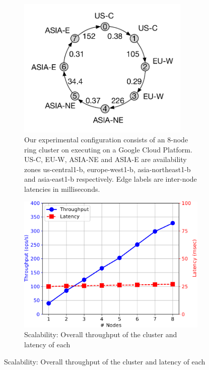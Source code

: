 \begin{figure}[t]
  \centering
	\begin{subfigure}{0.45\textwidth}
		\includegraphics[width=0.9\textwidth]{Figures/cluster.pdf}
		\caption{Our experimental configuration consists of an 8-node ring cluster
			on executing on a Google Cloud Platform. US-C, EU-W, ASIA-NE and ASIA-E
			are availability zones us-central1-b, europe-west1-b, asia-northeast1-b
			and asia-east1-b respectively. Edge labels are inter-node latencies in
		milliseconds.}
		\label{fig:cluster}
	\end{subfigure}
	\hfill
	\begin{subfigure}{0.45\textwidth}
		\includegraphics[width=\textwidth]{Graphs/scalability.pdf}
		\caption{Scalability: Overall throughput of the cluster and latency of each
}
\end{subfigure}
\end{figure}
